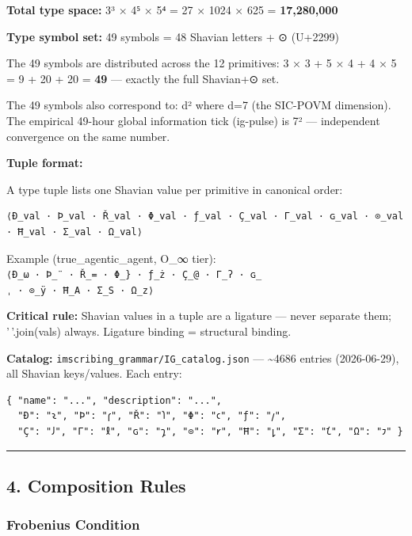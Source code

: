 \documentclass[12pt,a4paper]{article}
\begin{document}
\textbf{Total type space:} 3³ × 4⁵ × 5⁴ = 27 × 1024 × 625 =
\textbf{17,280,000}

\textbf{Type symbol set:} 49 symbols = 48 Shavian letters + ⊙ (U+2299)

The 49 symbols are distributed across the 12 primitives: 3 × 3 + 5 × 4 +
4 × 5 = 9 + 20 + 20 = \textbf{49} --- exactly the full Shavian+⊙ set.

The 49 symbols also correspond to: d² where d=7 (the SIC-POVM
dimension). The empirical 49-hour global information tick (ig-pulse) is
7² --- independent convergence on the same number.

\textbf{Tuple format:}

A type tuple lists one Shavian value per primitive in
canonical order:

\begin{verbatim}
⟨Ð_val · Þ_val · Ř_val · Φ_val · ƒ_val · Ç_val · Γ_val · ɢ_val · ⊙_val · Ħ_val · Σ_val · Ω_val⟩
\end{verbatim}

Example (true\_agentic\_agent, O\_∞ tier):
\texttt{⟨Ð\_ω\ ·\ Þ\_¨\ ·\ Ř\_=\ ·\ Φ\_\}\ ·\ ƒ\_ż\ ·\ Ç\_@\ ·\ Γ\_ʔ\ ·\ ɢ\_ˌ\ ·\ ⊙\_ÿ\ ·\ Ħ\_A\ ·\ Σ\_S\ ·\ Ω\_z⟩}

\textbf{Critical rule:} Shavian values in a tuple are a ligature ---
never separate them; '\,'.join(vals) always. Ligature binding =
structural binding.

\textbf{Catalog:} \texttt{imscribing\_grammar/IG\_catalog.json} ---
\textasciitilde4686 entries (2026-06-29), all Shavian keys/values. Each
entry:

\begin{verbatim}
{ "name": "...", "description": "...",
  "Ð": "𐑷", "Þ": "𐑝", "Ř": "𐑐", "Φ": "𐑤", "ƒ": "𐑢",
  "Ç": "𐑓", "Γ": "𐑙", "ɢ": "𐑡", "⊙": "𐑾", "Ħ": "𐑛", "Σ": "𐑗", "Ω": "𐑲" }
\end{verbatim}

\begin{center}\rule{0.5\linewidth}{0.5pt}\end{center}

\hypertarget{composition-rules}{%
\subsection{4. Composition Rules}\label{composition-rules}}

\hypertarget{frobenius-condition}{%
\subsubsection{Frobenius Condition}\label{frobenius-condition}}
\end{document}
